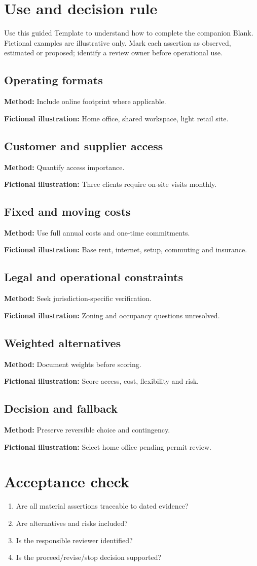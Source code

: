 \documentclass[11pt]{article}
\begin{document}
\SuiteOpen
\section{Use and decision rule}
Use this guided Template to understand how to complete the companion Blank. Fictional examples are illustrative only. Mark each assertion as observed, estimated or proposed; identify a review owner before operational use.
\subsection*{Operating formats}
\textbf{Method:} Include online footprint where applicable.\par\textbf{Fictional illustration:} Home office, shared workspace, light retail site.\par
\subsection*{Customer and supplier access}
\textbf{Method:} Quantify access importance.\par\textbf{Fictional illustration:} Three clients require on-site visits monthly.\par
\subsection*{Fixed and moving costs}
\textbf{Method:} Use full annual costs and one-time commitments.\par\textbf{Fictional illustration:} Base rent, internet, setup, commuting and insurance.\par
\subsection*{Legal and operational constraints}
\textbf{Method:} Seek jurisdiction-specific verification.\par\textbf{Fictional illustration:} Zoning and occupancy questions unresolved.\par
\subsection*{Weighted alternatives}
\textbf{Method:} Document weights before scoring.\par\textbf{Fictional illustration:} Score access, cost, flexibility and risk.\par
\subsection*{Decision and fallback}
\textbf{Method:} Preserve reversible choice and contingency.\par\textbf{Fictional illustration:} Select home office pending permit review.\par
\section{Acceptance check}
\begin{enumerate}[leftmargin=*,itemsep=5pt]
\item Are all material assertions traceable to dated evidence?
\item Are alternatives and risks included?
\item Is the responsible reviewer identified?
\item Is the proceed/revise/stop decision supported?
\end{enumerate}
\end{document}
